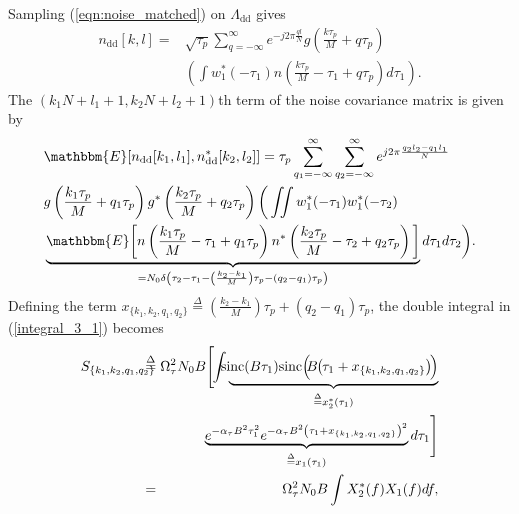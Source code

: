 Sampling (\ref{eqn:noise_matched}) on $\Lambda_{\mathrm{dd}}$ gives
\begin{align}
n_{\mathrm{dd}}[k,l]=&\sqrt{\tau_p}\sum_{q=-\infty}^{\infty}e^{-j2\pi\frac{ql}{N}}g\left(\frac{k\tau_p}{M}+q\tau_p\right) \nonumber \\
&\left(\int w_1^{*}(-\tau_1)n\left(\frac{k\tau_p}{M}-\tau_1+q\tau_p\right)d\tau_1\right).
\end{align}
The $(k_{1}N+l_1+1,k_{2}N+l_{2}+1)$th term of the noise covariance matrix is given by 
\begin{align}
&\mathbbm{E}[n_{\mathrm{dd}}[k_1,l_1],n_{\mathrm{dd}}^{*}[k_2,l_2]]=\tau_p\sum_{q_1=-\infty}^{\infty}\sum_{q_2=-\infty}^{\infty}e^{j2\pi\frac{q_2l_2-q_1l_1}{N}} \nonumber \\
&g\left(\frac{k_1\tau_p}{M}+q_1\tau_p\right)g^{*}\left(\frac{k_2\tau_p}{M}+q_2\tau_p\right)\bigg(\iint w_1^{*}(-\tau_1)w_1^{*}(-\tau_2) \nonumber \\
&\underbrace{\mathbbm{E}\bigg[n\left(\frac{k_1\tau_p}{M}-\tau_1+q_1\tau_p\right)n^{*}\left(\frac{k_2\tau_p}{M}-\tau_2+q_2\tau_p\right)\bigg]}_{=N_{0}\delta \left(\tau_2-\tau_1-\left(\frac{k_2-k_1}{M}\right)\tau_p-(q_2-q_1)\tau_p \right)}d\tau_1 d\tau_2\bigg).
\label{integral_3_1}
\end{align}
Defining the term 
$x_{\{k_1,k_2,q_1,q_2\}}\overset{\Delta}{=}\left(\frac{k_2-k_1}{M}\right)\tau_p+(q_2-q_1)\tau_p$, the double integral in (\ref{integral_3_1}) becomes
\begin{eqnarray}
S_{\{k_1,k_2,q_1,q_2\}} & \hspace{-3.5mm} \overset{\Delta}{=} & \hspace{-2.5mm} \Omega_{\tau}^{2}N_{0}B\Bigg[\hspace{-1mm}\int \underbrace{\hspace{-2mm} \mathrm{sinc}(B\tau_1)\mathrm{sinc}\Big(\hspace{-1.0mm}B\hspace{-0.25mm}\big(\hspace{-0.25mm}\tau_1+x_{\{k_1,k_2,q_1,q_2\}}\big)\hspace{-0.5mm}\Big)}_{\overset{\Delta}{=}x_{2}^{*}(\tau_1)} \nonumber \\
& \hspace{-3.5mm} & \hspace{-2.5mm} \underbrace{e^{-\alpha_{\tau}B^{2}\tau_1^{2}}e^{-\alpha_{\tau}B^{2}\left(\tau_1+x_{\{k_1,k_2,q_1,q_2\}}\right)^{2}}}_{\overset{\Delta}{=}x_1(\tau_1)}d\tau_1\Bigg] \nonumber \\
& \hspace{-3.5mm} = & \hspace{-2.5mm} \Omega_{\tau}^{2}N_{0}B\int X_{2}^{*}(f)X_1(f)df,
\label{integral_3_2}
\end{eqnarray}

